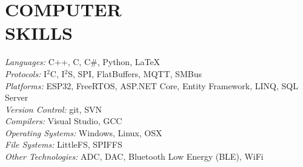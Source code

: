 \section{COMPUTER \\ SKILLS}
	{\sl Languages:} C++, C, C\#, Python, \LaTeX\\
	{\sl Protocols:} I$^2$C, I$^2$S, SPI, FlatBuffers, MQTT, SMBus\\
	{\sl Platforms:} ESP32, FreeRTOS, ASP.NET Core, Entity Framework, LINQ, SQL Server\\
	{\sl Version Control:} git, SVN\\
	{\sl Compilers:} Visual Studio, GCC\\
	{\sl Operating Systems:} Windows, Linux, OSX\\
	{\sl File Systems:} LittleFS, SPIFFS\\
	{\sl Other Technologies:} ADC, DAC, Bluetooth Low Energy (BLE), WiFi\\
